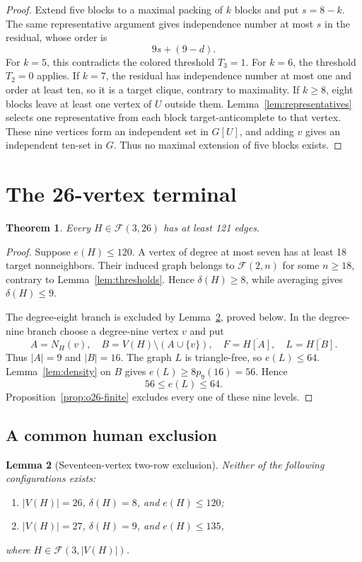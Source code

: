 \documentclass[11pt,reqno,a4paper]{amsart}
\newtheorem{theorem}{Theorem}[section]
\newtheorem{lemma}[theorem]{Lemma}
\theoremstyle{definition}
\theoremstyle{remark}
\newcommand{\comp}[1]{\overline{#1}}
\newcommand{\cF}{\mathcal F}
\begin{document}
\begin{proof}
Extend five blocks to a maximal packing of $k$ blocks and put
$s=8-k$. The same representative argument gives independence number at
most $s$ in the residual, whose order is
\[
 9s+(9-d).
\]
For $k=5$, this contradicts the colored threshold $T_3=1$. For $k=6$,
the threshold $T_2=0$ applies. If $k=7$, the residual has independence
number at most one and order at least ten, so it is a target clique,
contrary to maximality. If $k\ge8$, eight blocks leave at least one
vertex of $U$ outside them. Lemma~\ref{lem:representatives} selects one
representative from each block target-anticomplete to that vertex. These
nine vertices form an independent set in $G[U]$, and adding $v$ gives
an independent ten-set in $G$. Thus no maximal extension of five blocks
exists.
\end{proof}

\section{The 26-vertex terminal}\label{sec:o26}

\begin{theorem}\label{thm:o26}
Every $H\in\cF(3,26)$ has at least 121 edges.
\end{theorem}

\begin{proof}
Suppose $e(H)\le120$. A vertex of degree at most seven has at least
18 target nonneighbors. Their induced graph belongs to $\cF(2,n)$ for
some $n\ge18$, contrary to Lemma~\ref{lem:thresholds}. Hence
$\delta(H)\ge8$, while averaging gives $\delta(H)\le9$.

The degree-eight branch is excluded by
Lemma~\ref{lem:two-row}, proved below. In the degree-nine branch choose a
degree-nine vertex $v$ and put
\[
 A=N_H(v),\quad B=V(H)\setminus(A\cup\{v\}),\quad
 F=\comp{H[A]},\quad L=\comp{H[B]}.
\]
Thus $|A|=9$ and $|B|=16$. The graph $L$ is triangle-free, so
$e(L)\le64$. Lemma~\ref{lem:density} on $B$ gives
$e(L)\ge8p_9(16)=56$. Hence
\[
 56\le e(L)\le64.
\]
Proposition~\ref{prop:o26-finite} excludes every one of these nine levels.
\end{proof}

\subsection{A common human exclusion}

\begin{lemma}[Seventeen-vertex two-row exclusion]\label{lem:two-row}
Neither of the following configurations exists:
\begin{enumerate}[label=\textup{(\roman*)},leftmargin=2.5em]
\item $|V(H)|=26$, $\delta(H)=8$, and $e(H)\le120$;
\item $|V(H)|=27$, $\delta(H)=9$, and $e(H)\le135$,
\end{enumerate}
where $H\in\cF(3,|V(H)|)$.
\end{lemma}
\end{document}
